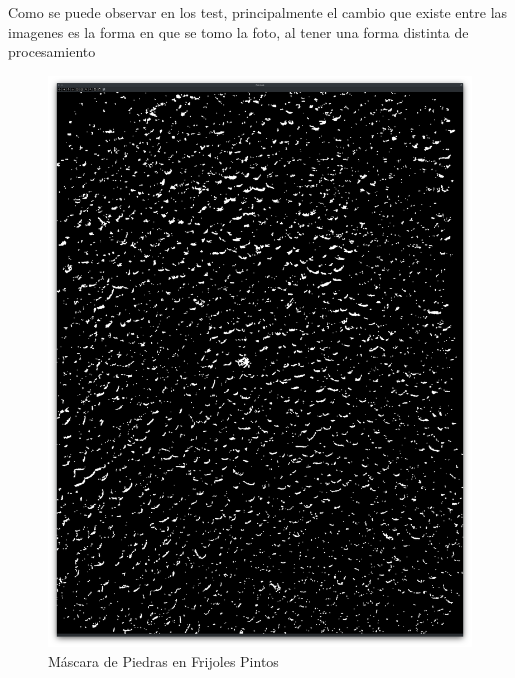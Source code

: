 \documentclass[conference]{IEEEtran}
\begin{document}
    Como se puede observar en los test, principalmente el cambio que existe entre las imagenes es la forma en que se tomo la foto, al tener una forma distinta de procesamiento 

    \begin{figure}[H]
        \centering
        \includegraphics[width=\breite\linewidth]{images/mascara_pintos.png}
        \caption{Máscara de Piedras en Frijoles Pintos}
        \label{fig:mascara_pintos}
    \end{figure}
\end{document}
